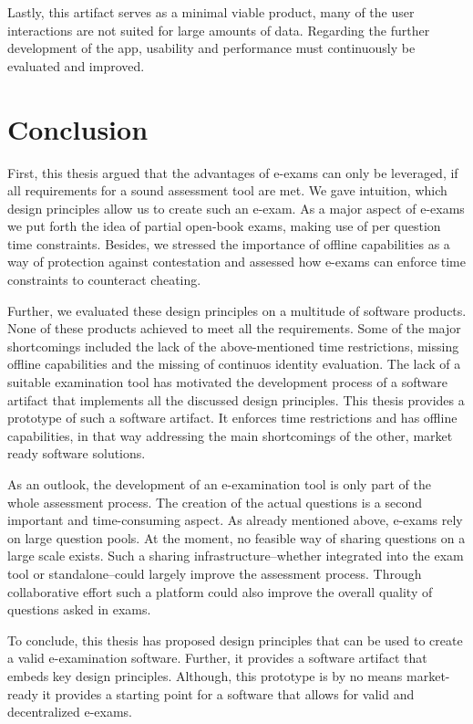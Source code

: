 Lastly, this artifact serves as a minimal viable product, many of the
user interactions are not suited for large amounts of data. Regarding
the further development of the app, usability and performance must
continuously be evaluated and improved.

\newpage

\hypertarget{conclusion}{%
\section{Conclusion}\label{conclusion}}

First, this thesis argued that the advantages of e-exams can only be
leveraged, if all requirements for a sound assessment tool are met. We
gave intuition, which design principles allow us to create such an
e-exam. As a major aspect of e-exams we put forth the idea of partial
open-book exams, making use of per question time constraints. Besides,
we stressed the importance of offline capabilities as a way of
protection against contestation and assessed how e-exams can enforce
time constraints to counteract cheating.

Further, we evaluated these design principles on a multitude of software
products. None of these products achieved to meet all the requirements.
Some of the major shortcomings included the lack of the above-mentioned
time restrictions, missing offline capabilities and the missing of
continuos identity evaluation. The lack of a suitable examination tool
has motivated the development process of a software artifact that
implements all the discussed design principles. This thesis provides a
prototype of such a software artifact. It enforces time restrictions and
has offline capabilities, in that way addressing the main shortcomings
of the other, market ready software solutions.

As an outlook, the development of an e-examination tool is only part of
the whole assessment process. The creation of the actual questions is a
second important and time-consuming aspect. As already mentioned above,
e-exams rely on large question pools. At the moment, no feasible way of
sharing questions on a large scale exists. Such a sharing
infrastructure--whether integrated into the exam tool or
standalone--could largely improve the assessment process. Through
collaborative effort such a platform could also improve the overall
quality of questions asked in exams.

To conclude, this thesis has proposed design principles that can be used
to create a valid e-examination software. Further, it provides a
software artifact that embeds key design principles. Although, this
prototype is by no means market-ready it provides a starting point for a
software that allows for valid and decentralized e-exams.

